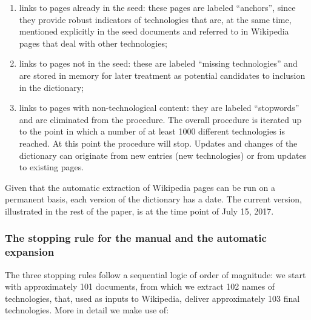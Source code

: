 \documentclass[]{book}
\providecommand{\tightlist}{%
  \setlength{\itemsep}{0pt}\setlength{\parskip}{0pt}}
\theoremstyle{definition}
\theoremstyle{definition}
\theoremstyle{definition}
\theoremstyle{remark}
\begin{document}
\begin{enumerate}
\def\labelenumi{\alph{enumi}.}
\tightlist
\item
  links to pages already in the seed: these pages are labeled
  ``anchors'', since they provide robust indicators of technologies that
  are, at the same time, mentioned explicitly in the seed documents and
  referred to in Wikipedia pages that deal with other technologies;
\item
  links to pages not in the seed: these are labeled ``missing
  technologies'' and are stored in memory for later treatment as
  potential candidates to inclusion in the dictionary;
\item
  links to pages with non-technological content: they are labeled
  ``stopwords'' and are eliminated from the procedure. The overall
  procedure is iterated up to the point in which a number of at least
  1000 different technologies is reached. At this point the procedure
  will stop. Updates and changes of the dictionary can originate from
  new entries (new technologies) or from updates to existing pages.
\end{enumerate}

Given that the automatic extraction of Wikipedia pages can be run on a
permanent basis, each version of the dictionary has a date. The current
version, illustrated in the rest of the paper, is at the time point of
July 15, 2017.

\subsubsection*{The stopping rule for the manual and the automatic
expansion}\label{the-stopping-rule-for-the-manual-and-the-automatic-expansion}

The three stopping rules follow a sequential logic of order of
magnitude: we start with approximately 101 documents, from which we
extract 102 names of technologies, that, used as inputs to Wikipedia,
deliver approximately 103 final technologies. More in detail we make use
of:
\end{document}

